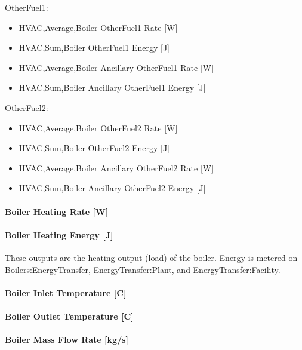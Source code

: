 OtherFuel1:

\begin{itemize}
    \item
    HVAC,Average,Boiler OtherFuel1 Rate {[}W{]}
    \item
    HVAC,Sum,Boiler OtherFuel1 Energy {[}J{]}
    \item
    HVAC,Average,Boiler Ancillary OtherFuel1 Rate {[}W{]}
    \item
    HVAC,Sum,Boiler Ancillary OtherFuel1 Energy {[}J{]}
\end{itemize}

OtherFuel2:

\begin{itemize}
    \item
    HVAC,Average,Boiler OtherFuel2 Rate {[}W{]}
    \item
    HVAC,Sum,Boiler OtherFuel2 Energy {[}J{]}
    \item
    HVAC,Average,Boiler Ancillary OtherFuel2 Rate {[}W{]}
    \item
    HVAC,Sum,Boiler Ancillary OtherFuel2 Energy {[}J{]}
\end{itemize}

\paragraph{Boiler Heating Rate {[}W{]}}\label{boiler-heating-rate-w}

\paragraph{Boiler Heating Energy {[}J{]}}\label{boiler-heating-energy-j}

These outputs are the heating output (load) of the boiler. Energy is metered on Boilers:EnergyTransfer, EnergyTransfer:Plant, and EnergyTransfer:Facility.

\paragraph{Boiler Inlet Temperature {[}C{]}}\label{boiler-inlet-temperature-c}

\paragraph{Boiler Outlet Temperature {[}C{]}}\label{boiler-outlet-temperature-c}

\paragraph{Boiler Mass Flow Rate {[}kg/s{]}}\label{boiler-mass-flow-rate-kgs}

